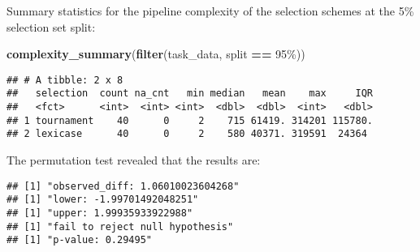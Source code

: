 \documentclass[
]{book}
\newenvironment{Shaded}{\begin{snugshade}}{\end{snugshade}}
\newcommand{\AttributeTok}[1]{\textcolor[rgb]{0.13,0.29,0.53}{#1}}
\newcommand{\DecValTok}[1]{\textcolor[rgb]{0.00,0.00,0.81}{#1}}
\newcommand{\FunctionTok}[1]{\textcolor[rgb]{0.13,0.29,0.53}{\textbf{#1}}}
\newcommand{\NormalTok}[1]{#1}
\newcommand{\OtherTok}[1]{\textcolor[rgb]{0.56,0.35,0.01}{#1}}
\newcommand{\SpecialCharTok}[1]{\textcolor[rgb]{0.81,0.36,0.00}{\textbf{#1}}}
\newcommand{\StringTok}[1]{\textcolor[rgb]{0.31,0.60,0.02}{#1}}
\begin{document}
Summary statistics for the pipeline complexity of the selection schemes at the 5\% selection set split:

\begin{Shaded}
\begin{Highlighting}[]
\FunctionTok{complexity\_summary}\NormalTok{(}\FunctionTok{filter}\NormalTok{(task\_data, split }\SpecialCharTok{==} \StringTok{\textquotesingle{}95\%\textquotesingle{}}\NormalTok{))}
\end{Highlighting}
\end{Shaded}

\begin{verbatim}
## # A tibble: 2 x 8
##   selection  count na_cnt   min median   mean    max     IQR
##   <fct>      <int>  <int> <int>  <dbl>  <dbl>  <int>   <dbl>
## 1 tournament    40      0     2    715 61419. 314201 115780.
## 2 lexicase      40      0     2    580 40371. 319591  24364
\end{verbatim}

The permutation test revealed that the results are:

\begin{Shaded}
\end{Shaded}

\begin{verbatim}
## [1] "observed_diff: 1.06010023604268"
## [1] "lower: -1.99701492048251"
## [1] "upper: 1.99935933922988"
## [1] "fail to reject null hypothesis"
## [1] "p-value: 0.29495"
\end{verbatim}
\end{document}
